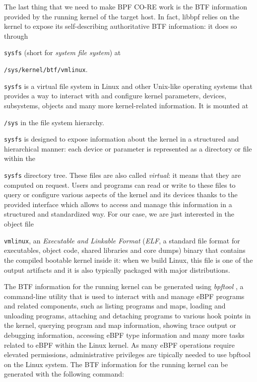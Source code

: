 The last thing that we need to make BPF CO-RE work is the BTF information provided by the running kernel of the target host.
In fact, libbpf relies on the kernel to expose its self-describing authoritative BTF information: it does so through \raggedright\colorbox{backcolour}{\lstinline[style=commandline, language=bash]|sysfs|} (short for \textit{system file system}) at \raggedright\colorbox{backcolour}{\lstinline[style=commandline, language=bash]|/sys/kernel/btf/vmlinux|}.
\raggedright\colorbox{backcolour}{\lstinline[style=commandline, language=bash]|sysfs|} is a virtual file system in Linux and other Unix-like operating systems that provides a way to interact with and configure kernel parameters, devices, subsystems, objects and many more kernel-related information. 
It is mounted at \raggedright\colorbox{backcolour}{\lstinline[style=commandline, language=bash]|/sys|} in the file system hierarchy.
\raggedright\colorbox{backcolour}{\lstinline[style=commandline, language=bash]|sysfs|} is designed to expose information about the kernel in a structured and hierarchical manner: each device or parameter is represented as a directory or file within the \raggedright\colorbox{backcolour}{\lstinline[style=commandline, language=bash]|sysfs|} directory tree. 
These files are also called \textit{virtual}: it means that they are computed on request.
Users and programs can read or write to these files to query or configure various aspects of the kernel and its devices thanks to the provided interface which allows to access and manage this information in a structured and standardized way.
For our case, we are just interested in the object file \raggedright\colorbox{backcolour}{\lstinline[style=commandline, language=bash]|vmlinux|}, an \textit{Executable and Linkable Format} (\textit{ELF}, a standard file format for executables, object code, shared libraries and core dumps) binary that contains the compiled bootable kernel inside it: when we build Linux, this file is one of the output artifacts and it is also typically packaged with major distributions. 

The BTF information for the running kernel can be generated using \textit{bpftool} \cite{bpftoolGitHubRepo}, a command-line utility that is used to interact with and manage eBPF programs and related components, such as listing programs and maps, loading and unloading programs, attaching and detaching programs to various hook points in the kernel, querying program and map information, showing trace output or debugging information, accessing eBPF type information and many more tasks related to eBPF within the Linux kernel.
As many eBPF operations require elevated permissions, administrative privileges are tipically needed to use bpftool on the Linux system.
The BTF information for the running kernel can be generated with the following command:


